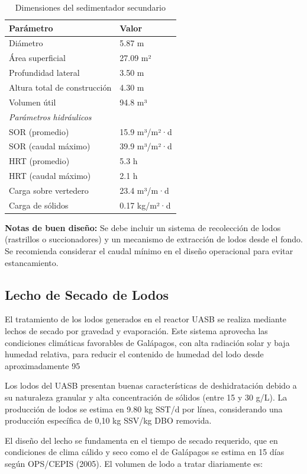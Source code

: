 \documentclass[12pt,a4paper]{article}
\begin{document}
\begin{table}[H]
\centering
\caption{Dimensiones del sedimentador secundario}
\begin{tabular}{ll}
\toprule
Parámetro & Valor \\
\midrule
Diámetro & 5.87 m \\
Área superficial & 27.09 m² \\
Profundidad lateral & 3.50 m \\
Altura total de construcción & 4.30 m \\
Volumen útil & 94.8 m³ \\
\midrule
\multicolumn{2}{l}{\textit{Parámetros hidráulicos}} \\
\midrule
SOR (promedio) & 15.9 m³/m²·d \\
SOR (caudal máximo) & 39.9 m³/m²·d \\
HRT (promedio) & 5.3 h \\
HRT (caudal máximo) & 2.1 h \\
Carga sobre vertedero & 23.4 m³/m·d \\
Carga de sólidos & 0.17 kg/m²·d \\
\bottomrule
\end{tabular}
\end{table}

\textbf{Notas de buen diseño:} Se debe incluir un sistema de recolección de lodos (rastrillos o succionadores) y un mecanismo de extracción de lodos desde el fondo. Se recomienda considerar el caudal mínimo en el diseño operacional para evitar estancamiento.

\subsection{Lecho de Secado de Lodos}

El tratamiento de los lodos generados en el reactor UASB se realiza mediante lechos de secado por gravedad y evaporación. Este sistema aprovecha las condiciones climáticas favorables de Galápagos, con alta radiación solar y baja humedad relativa, para reducir el contenido de humedad del lodo desde aproximadamente 95%

Los lodos del UASB presentan buenas características de deshidratación debido a su naturaleza granular y alta concentración de sólidos (entre 15 y 30 g/L). La producción de lodos se estima en 9.80 kg SST/d por línea, considerando una producción específica de 0,10 kg SSV/kg DBO removida.

El diseño del lecho se fundamenta en el tiempo de secado requerido, que en condiciones de clima cálido y seco como el de Galápagos se estima en 15 días según OPS/CEPIS (2005). El volumen de lodo a tratar diariamente es:
\end{document}
